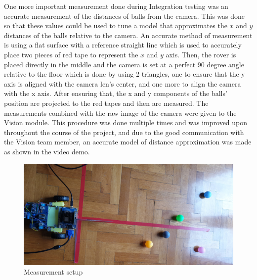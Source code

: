 \documentclass[a4paper]{article}
\begin{document}
    One more important measurement done during Integration testing was an accurate measurement of the distances of balls from the camera. This was done 
    so that these values could be used to tune a model that approximates the \(x\) and \(y\) distances of the balls relative to the camera. An accurate method 
    of measurement is using a flat surface with a reference straight line which is used to accurately place two pieces of red tape to represent the \(x\) and \(y\) axis. 
    Then, the rover is placed directly in the middle and the camera is set at a perfect 90 degree angle relative to the floor which is done by using 2 triangles, one to ensure that the y axis is aligned with the camera len's center, and one more to align the camera with the x axis.
    After ensuring that, the x and y components of the balls' position are projected to the red tapes and then are measured. The measurements combined with the raw image of the camera were given to the Vision module. This procedure was done multiple times and was improved upon throughout the course of the project, and due to the good communication with the Vision team member, an accurate model of distance approximation was made as shown in the video demo.
    \begin{figure}[H]
        \centering
        \includegraphics[scale=0.08]{./images/Ball_measurement.jpg}
        \caption{Measurement setup}
        \label{image:Measurement setup}
     \end{figure}




\end{document}
